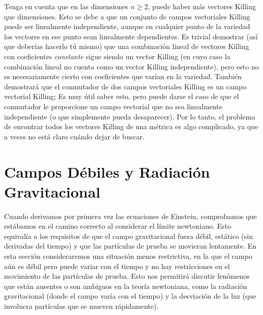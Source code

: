 \documentclass[11pt,b5paper,openany,twoside]{book}
\begin{document}
Tenga en cuenta que en las dimensiones $n\geq 2$, puede haber más vectores Killing que dimensiones.
Esto se debe a que un conjunto de campos vectoriales Killing puede ser linealmente independiente, aunque en cualquier punto de la variedad los vectores en ese punto sean linealmente dependientes.
Es trivial demostrar (así que deberías hacerlo tú mismo) que una combinación lineal de vectores Killing con coeficientes {\it constante} sigue siendo un vector Killing (en cuyo caso la combinación lineal no cuenta como un vector Killing independiente), pero esto no es necesariamente cierto con coeficientes que varían en la variedad.
También demostrará que el conmutador de dos campos vectoriales Killing es un campo vectorial Killing; Es muy útil saber esto, pero puede darse el caso de que el conmutador le proporcione un campo vectorial que no sea linealmente independiente (o que simplemente pueda desaparecer).
Por lo tanto, el problema de encontrar todos los vectores Killing de una métrica es algo complicado, ya que a veces no está claro cuándo dejar de buscar.





\chapter{Campos Débiles y Radiación Gravitacional}


Cuando derivamos por primera vez las ecuaciones de Einstein, comprobamos que estábamos en el camino correcto al considerar el límite newtoniano.
Esto equivalía a los requisitos de que el campo gravitacional fuera débil, estático (sin derivadas del tiempo) y que las partículas de prueba se movieran lentamente.
En esta sección consideraremos una situación menos restrictiva, en la que el campo aún es débil pero puede variar con el tiempo y no hay restricciones en el movimiento de las partículas de prueba.
Esto nos permitirá discutir fenómenos que están ausentes o son ambiguos en la teoría newtoniana, como la radiación gravitacional (donde el campo varía con el tiempo) y la desviación de la luz (que involucra partículas que se mueven rápidamente).
\end{document}
